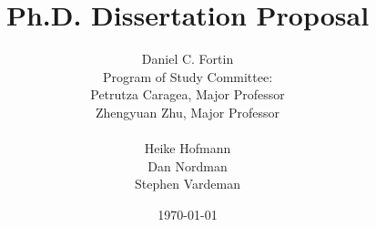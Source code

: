 \documentclass[16pt, english]{article}
\title{Ph.D. Dissertation Proposal}
\author{Daniel C. Fortin \\[6cm]
Program of Study Committee:\\[1cm]
Petrutza Caragea, Major Professor \\
Zhengyuan Zhu, Major Professor\\ \\
Heike Hofmann\\
Dan Nordman\\
Stephen Vardeman\\[2cm]
}
\date{\today}
\begin{document}
%
\maketitle
\newpage

\begingroup
\hypersetup{linkcolor=black}
\tableofcontents
\endgroup

\newpage
\begin{spacing}{1.9}






\end{spacing}
\begin{spacing}{1.2}

\end{spacing}
\newpage

%

\end{document}
